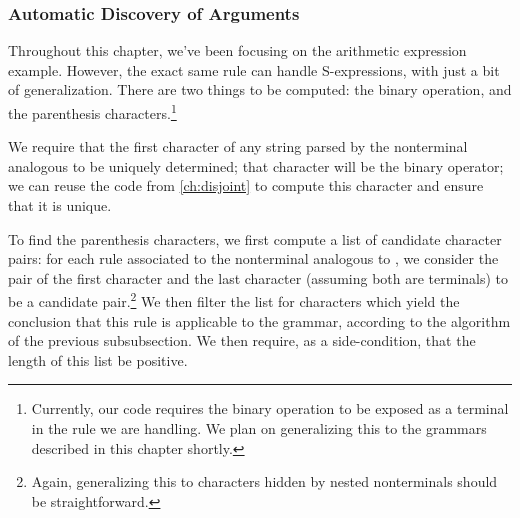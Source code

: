   \subsubsection{Automatic Discovery of Arguments}
    Throughout this chapter, we've been focusing on the arithmetic expression example.  However, the exact same rule can handle S-expressions, with just a bit of generalization.  There are two things to be computed: the binary operation, and the parenthesis characters.\footnote{Currently, our code requires the binary operation to be exposed as a terminal in the rule we are handling.  We plan on generalizing this to the grammars described in this chapter shortly.}
    
    We require that the first character of any string parsed by the nonterminal analogous to  be uniquely determined; that character will be the binary operator; we can reuse the code from \autoref{ch:disjoint} to compute this character and ensure that it is unique.
    
    To find the parenthesis characters, we first compute a list of candidate character pairs: for each rule associated to the nonterminal analogous to , we consider the pair of the first character and the last character (assuming both are terminals) to be a candidate pair.\footnote{Again, generalizing this to characters hidden by nested nonterminals should be straightforward.}  We then filter the list for characters which yield the conclusion that this rule is applicable to the grammar, according to the algorithm of the previous subsubsection.  We then require, as a side-condition, that the length of this list be positive.
    

